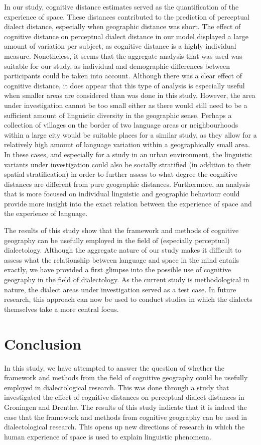 \documentclass[output=paper,colorlinks,citecolor=brown,draft]{langscibook}
\begin{document}
In our study, cognitive distance estimates served as the quantification of the experience of space. These distances contributed to the prediction of perceptual dialect distance, especially when geographic distance was short. The effect of cognitive distance on perceptual dialect distance in our model displayed a large amount of variation per subject, as cognitive distance is a highly individual measure. Nonetheless, it seems that the aggregate analysis that was used was suitable for our study, as individual and demographic differences between participants could be taken into account. Although there was a clear effect of cognitive distance, it does appear that this type of analysis is especially useful when smaller areas are considered than was done in this study. However, the area under investigation cannot be too small either as there would still need to be a sufficient amount of linguistic diversity in the geographic sense. Perhaps a collection of villages on the border of two language areas or neighbourhoods within a large city would be suitable places for a similar study, as they allow for a relatively high amount of language variation within a geographically small area. In these cases, and especially for a study in an urban environment, the linguistic variants under investigation could also be socially stratified (in addition to their spatial stratification) in order to further assess to what degree the cognitive distances are different from pure geographic distances. Furthermore, an analysis that is more focused on individual linguistic and geographic behaviour could provide more insight into the exact relation between the experience of space and the experience of language. 

The results of this study show that the framework and methods of cognitive geography can be usefully employed in the field of (especially perceptual) dialectology. Although the aggregate nature of our study makes it difficult to assess what the relationship between language and space in the mind entails exactly, we have provided a first glimpse into the possible use of cognitive geography in the field of dialectology. As the current study is methodological in nature, the dialect areas under investigation served as a test case. In future research, this approach can now be used to conduct studies in which the dialects themselves take a more central focus.

\section{Conclusion}
In this study, we have attempted to answer the question of whether the framework and methods from the field of cognitive geography could be usefully employed in dialectological research. This was done through a study that investigated the effect of cognitive distances on perceptual dialect distances in Groningen and Drenthe. The results of this study indicate that it is indeed the case that the framework and methods from cognitive geography can be used in dialectological research. This opens up new directions of research in which the human experience of space is used to explain linguistic phenomena. 
\end{document}
